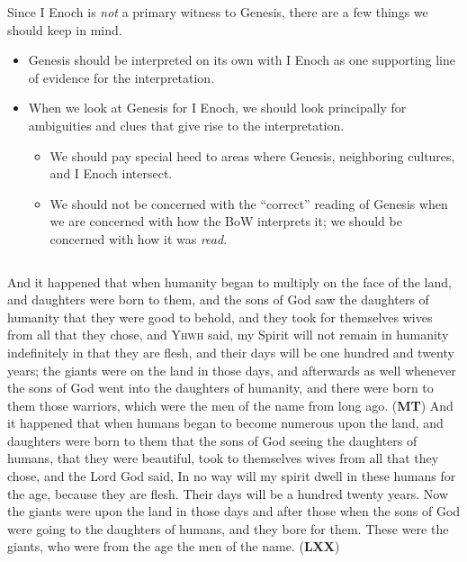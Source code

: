 \documentclass{beamer}
\begin{document}
\begin{frame}
  Since I Enoch is \emph{not} a primary witness to Genesis, there are a few things we should keep in mind.\pause
  \begin{itemize}
	\item Genesis should be interpreted on its own with I Enoch as one supporting line of evidence for the interpretation.\pause
	\item When we look at Genesis for I Enoch, we should look principally for ambiguities and clues that give rise to the interpretation.\pause
	  \begin{itemize}
		\item We should pay special heed to areas where Genesis, neighboring cultures, and I Enoch intersect.\pause
		\item We should not be concerned with the ``correct'' reading of Genesis when we are concerned with how the BoW interprets it; we should be concerned with how it was \emph{read}.
	  \end{itemize}
  \end{itemize}
\end{frame}

\begin{frame}
  \begin{columns}
	\footnotesize{And it happened that when humanity began to multiply on the face of the land, and daughters were born to them,
	and the sons of God saw the daughters of humanity that they were good to behold, and they took for themselves wives from all that they chose,
	and \textsc{Yhwh} said, my Spirit will not remain in humanity indefinitely in that they are flesh, and their days will be one hundred and twenty years;
	the giants were on the land in those days, and afterwards as well whenever the sons of God went into the daughters of humanity, and there were born to them those warriors, which were the men of the name from long ago. (\textbf{MT})}
	\footnotesize{And it happened that when humans began to become numerous upon the land, and daughters were born to them
	that the sons of God seeing the daughters of humans, that they were beautiful, took to themselves wives from all that they chose,
	and the Lord God said, In no way will my spirit dwell in these humans for the age, because they are flesh. Their days will be a hundred twenty years.
	Now the giants were upon the land in those days and after those when the sons of God were going to the daughters of humans, and they bore for them. These were the giants, who were from the age the men of the name. (\textbf{LXX})}
  \end{columns}
\end{frame}
\end{document}

